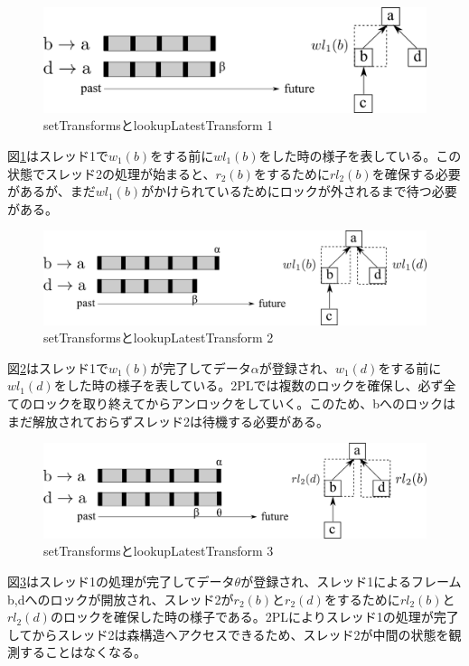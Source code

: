 \documentclass[a4paper]{jreport}	%
\begin{document}
\begin{figure}[h] 
\centering
\includegraphics[width=12cm]{setTransforms1}
\caption{setTransformsとlookupLatestTransform 1}
\label{fig:setTransforms1}
\end{figure}

図\ref{fig:setTransforms1}はスレッド1で$w_1(b)$をする前に$wl_1(b)$をした時の様子を表している。この状態でスレッド2の処理が始まると、$r_2(b)$をするために$rl_2(b)$を確保する必要があるが、まだ$wl_1(b)$がかけられているためにロックが外されるまで待つ必要がある。

\begin{figure}[h] 
\centering
\includegraphics[width=12cm]{setTransforms2}
\caption{setTransformsとlookupLatestTransform 2}
\label{fig:setTransforms2}
\end{figure}

図\ref{fig:setTransforms2}はスレッド1で$w_1(b)$が完了してデータ$\alpha$が登録され、$w_1(d)$をする前に$wl_1(d)$をした時の様子を表している。2PLでは複数のロックを確保し、必ず全てのロックを取り終えてからアンロックをしていく。このため、bへのロックはまだ解放されておらずスレッド2は待機する必要がある。


\begin{figure}[h] 
\centering
\includegraphics[width=12cm]{setTransforms3}
\caption{setTransformsとlookupLatestTransform 3}
\label{fig:setTransforms3}
\end{figure}


図\ref{fig:setTransforms3}はスレッド1の処理が完了してデータ$\theta$が登録され、スレッド1によるフレームb,dへのロックが開放され、スレッド2が$r_2(b)$と$r_2(d)$をするために$rl_2(b)$と$rl_2(d)$のロックを確保した時の様子である。2PLによりスレッド1の処理が完了してからスレッド2は森構造へアクセスできるため、スレッド2が中間の状態を観測することはなくなる。
\end{document}
